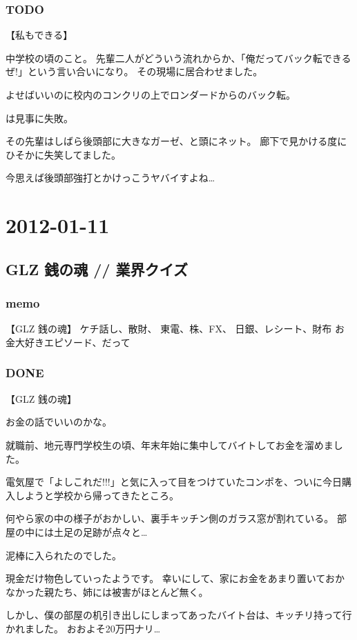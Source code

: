 \documentclass[11pt]{article}
\begin{document}
\subsubsection{\textbf{TODO}}
\label{sec-12_1_2}

【私もできる】

中学校の頃のこと。
先輩二人がどういう流れからか、「俺だってバック転できるぜ!」という言い合いになり。
その現場に居合わせました。

よせばいいのに校内のコンクリの上でロンダードからのバック転。

は見事に失敗。

その先輩はしばら後頭部に大きなガーゼ、と頭にネット。
廊下で見かける度にひそかに失笑してました。

今思えば後頭部強打とかけっこうヤバイすよね…
\section{2012-01-11}
\label{sec-13}
\subsection{GLZ 銭の魂 // 業界クイズ}
\label{sec-13_1}
\subsubsection{memo}
\label{sec-13_1_1}

【GLZ 銭の魂】
ケチ話し、散財、
東電、株、FX、
日銀、レシート、財布
お金大好きエピソード、だって
\subsubsection{\textbf{DONE}}
\label{sec-13_1_2}

【GLZ 銭の魂】

お金の話でいいのかな。

就職前、地元専門学校生の頃、年末年始に集中してバイトしてお金を溜めました。

電気屋で「よしこれだ!!!」と気に入って目をつけていたコンポを、ついに今日購入しようと学校から帰ってきたところ。

何やら家の中の様子がおかしい、裏手キッチン側のガラス窓が割れている。
部屋の中には土足の足跡が点々と…

泥棒に入られたのでした。

現金だけ物色していったようです。
幸いにして、家にお金をあまり置いておかなかった親たち、姉には被害がほとんど無く。

しかし、僕の部屋の机引き出しにしまってあったバイト台は、キッチリ持って行かれました。
おおよそ20万円ナリ…
\end{document}
